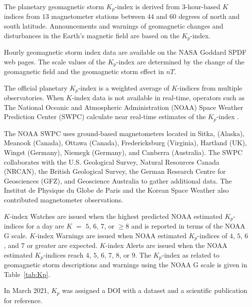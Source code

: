 \documentclass[sn-mathphys-num]{sn-jnl}%
\begin{document}
The planetary geomagnetic storm $K_{p}$-index \cite{Matzka2024} is derived from $3$-hour-based $K$ indices from $13$ magnetometer stations between $44$ and $60$ degrees of north and south latitude. Announcements and warnings \cite{NOAA2024cAlertsWatches} of geomagnetic changes and disturbances in the Earth's magnetic field are based on the $K_{p}$-index.

Hourly geomagnetic storm index data are available on the NASA Goddard SPDF \cite{Papitashvili2024About, Papitashvili2024Explorer} web pages. The scale values of the $K_{p}$-index are determined by the change of the geomagnetic field and the geomagnetic storm effect in $nT$.

The official planetary $K_{p}$-index is a weighted average of $K$-indices from multiple observatories. When $K$-index data is not available in real-time, operators such as The National Oceanic and Atmospheric Administration (NOAA) Space Weather Prediction Center (SWPC) calculate near real-time estimates of the $K_{p}$-index \cite{Myint2022}.

The NOAA SWPC \cite{NOAA2024dPlanetary} uses ground-based magnetometers located in Sitka, (Alaska), Meanook (Canada), Ottawa (Canada), Fredericksburg (Virginia), Hartland (UK), Wingst (Germany), Niemegk (Germany), and Canberra (Australia). The SWPC collaborates with the U.S. Geological Survey, Natural Resources Canada (NRCAN), the British Geological Survey, the German Research Centre for Geosciences (GFZ), and Geoscience Australia to gather additional data. The Institut de Physique du Globe de Paris and the Korean Space Weather also contributed magnetometer observations. 

$K$-index Watches are issued when the highest predicted NOAA estimated $K_{p}$-indices for a day are $K$ $=$ $5$, $6$, $7$, or $\geq 8$ and is reported in terms of the NOAA G scale. $K$-index Warnings are issued when NOAA estimated $K_{p}$-indices of $4$, $5$, $6$, and $7$ or greater are expected. $K$-index Alerts are issued when the NOAA estimated $K_{p}$-indices reach $4$, $5$, $6$, $7$, $8$, or $9$. The $K_{p}$-index as related to geomagnetic storm descriptions and warnings using the NOAA G scale \cite{NOAA2024eSpace, NOAA2024fScales} is given in Table~\ref{tab:Kp}.

In March 2021, $K_{p}$ was assigned a DOI with a dataset \cite{Matzka2021a} and a scientific publication \cite{Matzka2021b} for reference.
\end{document}
